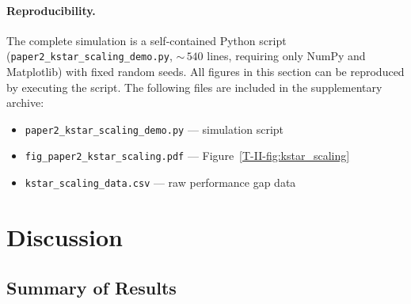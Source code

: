 \documentclass[12pt,a4paper,openany]{book}
\begin{document}
\paragraph{Reproducibility.}
\begin{sloppypar}
The complete simulation is a self-contained Python script
(\texttt{paper2\_kstar\_scaling\_demo.py}, ${\sim}\,540$
lines, requiring only NumPy and Matplotlib) with fixed
random seeds.  All figures in this section can be
reproduced by executing the script.  The following files
are included in the supplementary archive:
\begin{itemize}
\item \texttt{paper2\_kstar\_scaling\_demo.py} --- simulation script
\item \texttt{fig\_paper2\_kstar\_scaling.pdf} --- Figure~\ref{T-II-fig:kstar_scaling}
\item \texttt{kstar\_scaling\_data.csv} --- raw performance gap data
\end{itemize}
\end{sloppypar}

\section{Discussion}
\label{T-II-sec:discussion}

\subsection{Summary of Results}
\label{T-II-subsec:summary}
\end{document}
